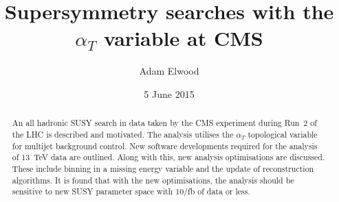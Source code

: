 

\title{Supersymmetry searches with the $\alpha_T$ variable at CMS}
\date{5 June 2015}
\author{Adam Elwood}

\maketitle        
        
\begin{abstract}
  \noindent
An all hadronic SUSY search in data taken by the CMS experiment during Run~2 of the LHC is described and motivated. The analysis utilises the $\alpha_T$ topological variable for multijet background control. New software developments required for the analysis of $13$~TeV data are outlined. Along with this, new analysis optimisations are discussed. These include binning in a missing energy variable and the update of reconstruction algorithms. It is found that with the new optimisations, the analysis should be sensitive to new SUSY parameter space with $10/$fb of data or less.
\end{abstract}












